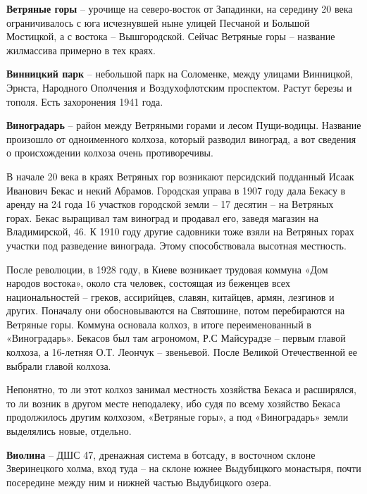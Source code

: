 \medskip

\textbf{Ветряные горы} – урочище на северо-восток от Западинки, на середину 20 века ограничивалось с юга исчезнувшей ныне улицей Песчаной и Большой Мостицкой, а с востока – Вышгородской. Сейчас Ветряные горы – название жилмассива примерно в тех краях.\\

\medskip

\textbf{Винницкий парк} – небольшой парк на Соломенке, между улицами Винницкой, Эрнста, Народного Ополчения и Воздухофлотским проспектом. Растут березы и тополя. Есть захоронения 1941 года.\\

\medskip

\textbf{Виноградарь} – район между Ветряными горами и лесом Пущи-водицы. Название произошло от одноименного колхоза, который разводил виноград, а вот сведения о происхождении колхоза очень противоречивы.

В начале 20 века в краях Ветряных гор возникают персидский подданный Исаак Иванович Бекас и некий Абрамов. Городская управа в 1907 году дала Бекасу в аренду на 24 года 16 участков городской земли – 17 десятин – на Ветряных горах. Бекас выращивал там виноград и продавал его, заведя магазин на Владимирской, 46. К 1910 году другие садовники тоже взяли на Ветряных горах участки под разведение винограда. Этому способствовала высотная местность.

После революции, в 1928 году, в Киеве возникает трудовая коммуна «Дом народов востока», около ста человек, состоящая из беженцев всех национальностей – греков, ассирийцев, славян, китайцев, армян, лезгинов и других. Поначалу они обосновываются на Святошине, потом перебираются на Ветряные горы. Коммуна основала колхоз, в итоге переименованный в «Виноградарь». Бекасов был там агрономом, Р.С Майсурадзе – первым главой колхоза, а 16-летняя О.Т. Леончук – звеньевой. После Великой Отечественной ее выбрали главой колхоза.

Непонятно, то ли этот колхоз занимал местность хозяйства Бекаса и расширялся, то ли возник в другом месте неподалеку, ибо судя по всему хозяйство Бекаса продолжилось другим колхозом, «Ветряные горы», а под «Виноградарь» земли выделялись новые, отдельно.\\ 

\medskip

\textbf{Виолина} – ДШС 47, дренажная система в ботсаду, в восточном склоне Зверинецкого холма, вход туда – на склоне южнее Выдубицкого монастыря, почти посередине между ним и нижней частью Выдубицкого озера.\\


